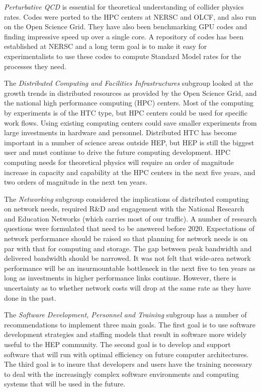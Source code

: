 {\it Perturbative QCD} is essential for theoretical understanding of
collider physics rates. Codes were ported to the HPC centers at NERSC and
OLCF, and also run on the Open Science Grid. They have also been
benchmarking GPU codes and finding impressive speed up over a single core.
A repository of codes has been established at NERSC and a long term goal is
to make it easy for experimentalists to use these codes to compute Standard
Model rates for the processes they need.

The {\it Distributed Computing and Facilities Infrastructures} subgroup
looked at the growth trends in distributed resources as provided by the
Open Science Grid, and the national high performance computing (HPC)
centers. Most of the computing by experiments is of the HTC type, but HPC
centers could be used for specific work flows. Using existing computing
centers could save smaller experiments from large investments in hardware
and personnel. Distributed HTC has become important in a number of science
areas outside HEP, but HEP is still the biggest user and must continue to
drive the future computing development. HPC computing needs for theoretical
physics will require an order of magnitude increase in capacity and
capability at the HPC centers in the next five years, and two orders of
magnitude in the next ten years.

The {\it Networking} subgroup considered the implications of distributed
computing on network needs, required R\&D and engagement with the National
Research and Education Networks (which carries most of our traffic). A
number of research questions were formulated that need to be answered
before 2020. Expectations of network performance should be raised so that
planning for network needs is on par with that for computing and storage.
The gap between peak bandwidth and delivered bandwidth should be narrowed.
It was not felt that wide-area network performance will be an
insurmountable bottleneck in the next five to ten years as long as
investments in higher performance links continue. However, there is
uncertainty as to whether network costs will drop at the same rate as they
have done in the past.

The {\it Software Development, Personnel and Training} subgroup has a
number of recommendations to implement three main goals. The first goal is
to use software development strategies and staffing models that result in
software more widely useful to the HEP community. The second goal is to
develop and support software that will run with optimal efficiency on
future computer architectures. The third goal is to insure that developers
and users have the training necessary to deal with the increasingly complex
software environments and computing systems that will be used in the future.

